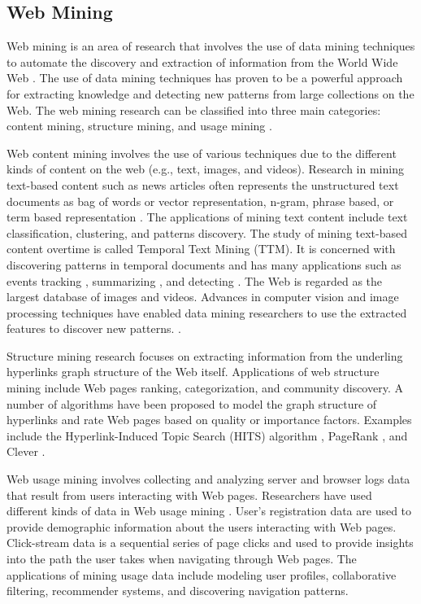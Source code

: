 \subsection{Web Mining}
Web mining is an area of research that involves the use of data mining techniques to automate the discovery and extraction of information from the World Wide Web \cite{etzioni_1996_Communication_ACM}.
The use of data mining techniques has proven to be a powerful approach for extracting knowledge and detecting new patterns from large collections on the Web.
The web mining research can be classified into three main categories: content mining, structure mining, and usage mining \cite{madria_1999_Springer,kosala_2000_Survey}.

Web content mining involves the use of various techniques due to the different kinds of content on the web (e.g., text, images, and videos).
Research in mining text-based content such as news articles often represents the unstructured text documents as bag of words or vector representation, n-gram, phrase based, or term based representation \cite{manning_2008_intro_to_IR}.
The applications of mining text content include text classification, clustering, and  patterns discovery.
The study of mining text-based content overtime is called Temporal Text Mining (TTM).
It is concerned with discovering patterns in temporal documents and has many applications such as events tracking \cite{ha_2009_IR}, summarizing \cite{Mei_2005_KDD}, and detecting \cite{huang_2014_WWW}.
The Web is regarded as the largest database of images and videos.
Advances in computer vision and image processing techniques have enabled data mining researchers to use the extracted features to discover new patterns. \cite{Wang_2011_SIGIR, Wu_2011_WSDM}.

Structure mining research focuses on extracting information from the underling hyperlinks graph structure of the Web itself.
Applications of web structure mining include Web pages ranking, categorization, and community discovery.
A number of algorithms have been proposed to model the graph structure of hyperlinks and rate Web pages based on quality or importance factors. Examples include the Hyperlink-Induced Topic Search (HITS) algorithm \cite{Kleinberg_1999_JACM}, PageRank \cite{Brin_1998_PageRank}, and Clever \cite{chakrabarti_1999_Computer}.

Web usage mining involves collecting and analyzing server and browser logs data that result from users interacting with Web pages.
Researchers have used different kinds of data in Web usage mining 
\cite{srivastava_2000_KDDNewsLetter}.
User's registration data are used to provide demographic information about the users interacting with Web pages.
Click-stream data is a sequential series of page clicks and used to provide insights into the path the user takes when navigating through Web pages.
The applications of mining usage data include modeling user profiles, collaborative filtering, recommender systems, and discovering navigation patterns.
